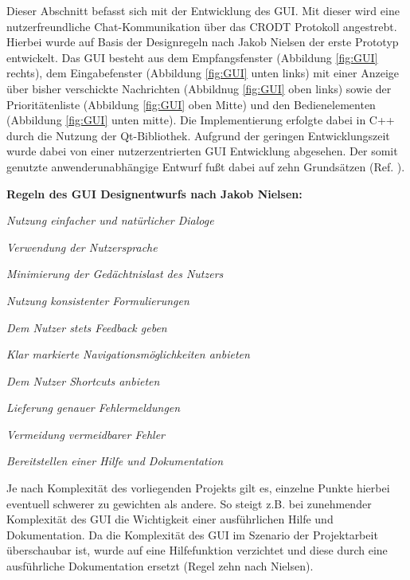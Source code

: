 \label{cap:chatGui}

Dieser Abschnitt befasst sich mit der Entwicklung des \gls{GUI}. Mit dieser
wird eine nutzerfreundliche Chat-Kommunikation über das \gls{CRODT} Protokoll
angestrebt.
Hierbei wurde auf Basis der Designregeln nach Jakob Nielsen der erste Prototyp
entwickelt.
\newline Das GUI besteht aus dem Empfangsfenster (Abbildung
\ref{fig:GUI} rechts), dem Eingabefenster (Abbildung \ref{fig:GUI}
unten links) mit einer Anzeige über bisher verschickte Nachrichten
(Abbildnug \ref{fig:GUI} oben links) sowie der Priorit{\"a}tenliste
(Abbildung \ref{fig:GUI} oben Mitte) und den Bedienelementen (Abbildung
\ref{fig:GUI} unten mitte). Die Implementierung erfolgte dabei in C++
durch die Nutzung der Qt-Bibliothek. Aufgrund der geringen Entwicklungszeit
wurde dabei von einer nutzerzentrierten \gls{GUI} Entwicklung abgesehen. Der
somit genutzte anwenderunabh{\"a}ngige Entwurf fu{\ss}t dabei auf zehn
Grunds{\"a}tzen (Ref. \cite{Nielsen}).

\textbf{Regeln des \gls{GUI} Designentwurfs nach Jakob Nielsen:}

   \begin{compactenum}[I]
     \item \textit{Nutzung einfacher und nat{\"u}rlicher Dialoge}
     \item \textit{Verwendung der Nutzersprache}
     \item \textit{Minimierung der Ged{\"a}chtnislast des Nutzers}
     \item \textit{Nutzung konsistenter Formulierungen}
     \item \textit{Dem Nutzer stets Feedback geben}
     \item \textit{Klar markierte Navigationsm{\"o}glichkeiten anbieten}
     \item \textit{Dem Nutzer Shortcuts anbieten}
     \item \textit{Lieferung genauer Fehlermeldungen}
     \item \textit{Vermeidung vermeidbarer Fehler}
     \item \textit{Bereitstellen einer Hilfe und Dokumentation}
   \end{compactenum}
   \label{Nielsen}

Je nach Komplexit{\"a}t des vorliegenden Projekts gilt es, einzelne Punkte
hierbei eventuell schwerer zu gewichten als andere. So steigt z.B. bei
zunehmender Komplexit{\"a}t des \gls{GUI} die Wichtigkeit einer ausf{\"u}hrlichen
Hilfe und Dokumentation. Da die Komplexit{\"a}t des \gls{GUI} im Szenario der
Projektarbeit {\"u}berschaubar ist, wurde auf eine Hilfefunktion verzichtet
und diese durch eine ausf{\"u}hrliche Dokumentation ersetzt (Regel zehn nach
Nielsen).

